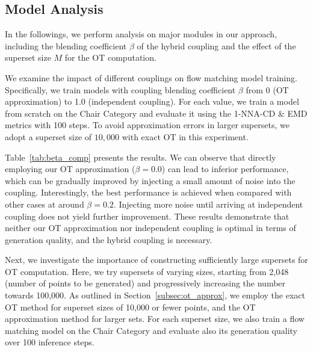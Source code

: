 \vspace{-3mm}
\subsection{Model Analysis}
\label{subsec:model_analysis}
\vspace{-3mm}
In the followings, we perform analysis on 
major
modules in our approach, including the blending coefficient $\beta$ of the hybrid coupling and the effect of the superset size $M$ for the OT computation.


We examine the impact of different couplings on flow matching model training.
%
Specifically, we train models with coupling blending coefficient $\beta$ from 0 (OT approximation) to 1.0 (independent coupling).
%
For each  value, we train a model from scratch on the Chair Category and evaluate it using the 1-NNA-CD \& EMD metrics with 100 steps.
%
To avoid approximation errors in larger supersets, we adopt a superset size of $10,000$ with exact OT in this experiment.

Table~\ref{tab:beta_comp} presents the results.
%
We can observe that directly employing our OT approximation ($\beta = 0.0$) can lead to 
inferior performance, which can be gradually improved by injecting a small amount of noise into the coupling.
%
Interestingly, the best performance is achieved when compared with other cases at around $\beta=0.2$. 
%
Injecting more noise until arriving at independent coupling does not yield further improvement.
%
These results demonstrate that neither our OT approximation nor independent coupling is optimal in terms of generation quality, and the hybrid coupling is necessary.
%

Next, we investigate the importance of constructing sufficiently large supersets for OT computation.
%
Here, we try supersets of varying sizes, starting from 2,048 (number of points to be generated) and progressively increasing the number towards 100,000.
%
As outlined in Section~\ref{subsec:ot_approx}, we employ the exact OT method for superset sizes of 10,000 or fewer points, and the OT approximation method for larger sets.
%
For each superset size, we also train a flow matching model on the Chair Category and evaluate also its generation quality over 100 inference steps.

